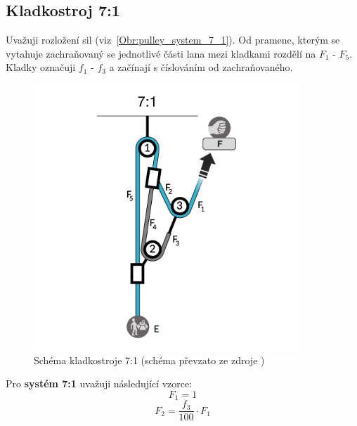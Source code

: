 \subsection{Kladkostroj 7:1}
Uvažuji rozložení sil (viz~\autoref{Obr:pulley_system_7_1}). Od pramene, kterým se vytahuje zachraňovaný se jednotlivé části lana mezi kladkami rozdělí na ${F_1}$ - ${F_5}$. Kladky označuji ${f_1}$ - ${f_3}$ a začínají s číslováním od zachraňovaného.
\begin{figure}[!hbt]
    \centering
    \includegraphics[width=10.0cm]{Figures/7_1/3_haul_syste_7_1_changed.png}
    \caption[Schéma kladkostroje 7:1]{Schéma kladkostroje 7:1 (schéma převzato ze zdroje \cite{Petzl_2022})}
    \label{Obr:pulley_system_7_1}
\end{figure} 
\newpage
\noindent Pro \textbf{systém 7:1} uvažuji následující vzorce:
\begin{equation}
    \label{eqn:1_calculation_7_1}
    F_1 = 1
\end{equation}
\begin{equation}
    \label{eqn:2_calculation_7_1}
    F_2 = \frac{f_3}{100} \cdot F_1
\end{equation}
